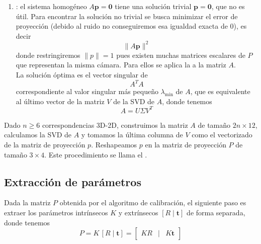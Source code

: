 \begin{enumerate}
    $$\mathbf{A\mathbf{p} = \mathbf{0}}$$
    de dimensión $2n\times 12$.
    \item {}: el sistema homogéneo $A\mathbf{p} = \mathbf{0}$ tiene una solución trivial $\mathbf{p} = \mathbf{0}$, que no es útil. Para encontrar la solución no trivial se busca minimizar el error de proyección (debido al ruido no conseguiremos esa igualdad exacta de $0$), es decir
    $$\|A\mathbf{p}\|^2$$
    donde restringiremos $\|p\|=1$ pues existen muchas matrices escalares de $P$ que representan la misma cámara. Para ellos se aplica la  a la matriz $A$. \\
    
    \noindent
    La solución óptima es el vector singular de 
    $$A^T A$$
    correspondiente al valor singular más pequeño $\lambda_{\min}$ de $A$, que es equivalente al último vector de la matriz $V$ de la SVD de $A$, donde tenemos  
    $$A = U \Sigma V^T$$
\end{enumerate}

\begin{observacion}
    Dado $n \geq 6$ correspondencias 3D-2D, construimos la matriz $A$ de tamaño $2n \times 12$, calculamos la SVD de $A$ y tomamos la última columna de $V$ como el vectorizado de la matriz de proyección $p$. Reshapeamos $p$ en la matriz de proyección $P$ de tamaño $3 \times 4$. Este procedimiento se llama el .
\end{observacion}

\subsection{Extracción de parámetros}
\noindent
Dada la matriz $P$ obtenida por el algoritmo de calibración, el siguiente paso es extraer los parámetros intrínsecos $K$ y extrínsecos $[R \mid \mathbf{t}]$ de forma separada, donde tenemos
\begin{equation*}
P = K \, [R \mid \mathbf{t}] = \begin{bmatrix} KR & \mid & K\mathbf{t} \end{bmatrix}
\end{equation*}

